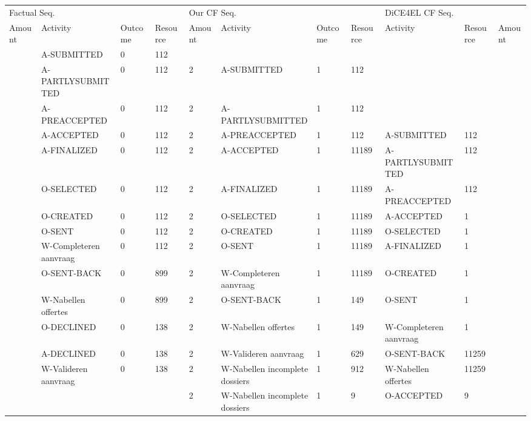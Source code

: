\begin{tabular}{lllllllllll}
\toprule
\multicolumn{4}{l}{Factual Seq.} & \multicolumn{4}{l}{Our CF Seq.} & \multicolumn{3}{l}{DiCE4EL CF Seq.} \\
Amount & Activity & Outcome & Resource & Amount & Activity & Outcome & Resource & Activity & Resource & Amount \\
\midrule
 & A-SUBMITTED & 0 & 112 &  &  &  &  &  &  &  \\
 & A-PARTLYSUBMITTED & 0 & 112 & 2 & A-SUBMITTED & 1 & 112 &  &  &  \\
 & A-PREACCEPTED & 0 & 112 & 2 & A-PARTLYSUBMITTED & 1 & 112 &  &  &  \\
 & A-ACCEPTED & 0 & 112 & 2 & A-PREACCEPTED & 1 & 112 & A-SUBMITTED & 112 &  \\
 & A-FINALIZED & 0 & 112 & 2 & A-ACCEPTED & 1 & 11189 & A-PARTLYSUBMITTED & 112 &  \\
 & O-SELECTED & 0 & 112 & 2 & A-FINALIZED & 1 & 11189 & A-PREACCEPTED & 112 &  \\
 & O-CREATED & 0 & 112 & 2 & O-SELECTED & 1 & 11189 & A-ACCEPTED & 1 &  \\
 & O-SENT & 0 & 112 & 2 & O-CREATED & 1 & 11189 & O-SELECTED & 1 &  \\
 & W-Completeren aanvraag & 0 & 112 & 2 & O-SENT & 1 & 11189 & A-FINALIZED & 1 &  \\
 & O-SENT-BACK & 0 & 899 & 2 & W-Completeren aanvraag & 1 & 11189 & O-CREATED & 1 &  \\
 & W-Nabellen offertes & 0 & 899 & 2 & O-SENT-BACK & 1 & 149 & O-SENT & 1 &  \\
 & O-DECLINED & 0 & 138 & 2 & W-Nabellen offertes & 1 & 149 & W-Completeren aanvraag & 1 &  \\
 & A-DECLINED & 0 & 138 & 2 & W-Valideren aanvraag & 1 & 629 & O-SENT-BACK & 11259 &  \\
 & W-Valideren aanvraag & 0 & 138 & 2 & W-Nabellen incomplete dossiers & 1 & 912 & W-Nabellen offertes & 11259 &  \\
 &  &  &  & 2 & W-Nabellen incomplete dossiers & 1 & 9 & O-ACCEPTED & 9 &  \\
\bottomrule
\end{tabular}
